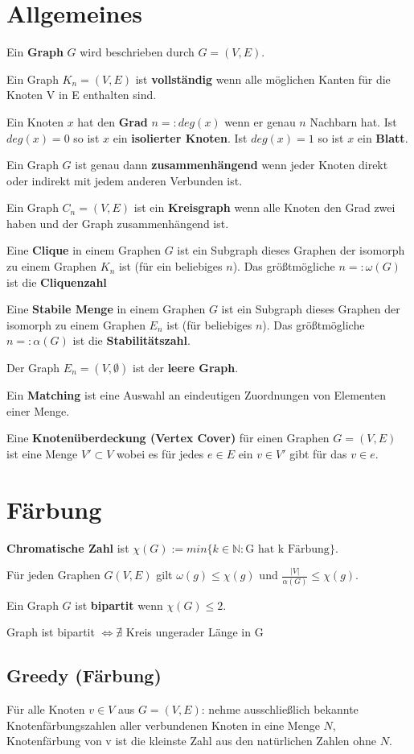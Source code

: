 \documentclass[10pt,a4paper]{article}
\begin{document}
\section{Allgemeines}
Ein \textbf{Graph} $G$ wird beschrieben durch $G = (V, E)$.

Ein Graph $K_n = (V, E)$ ist \textbf{vollständig} wenn alle möglichen Kanten für die Knoten V in E enthalten sind.

Ein Knoten $x$ hat den \textbf{Grad} $n =: deg(x)$ wenn er genau $n$ Nachbarn hat. Ist $deg(x) = 0$ so ist $x$ ein \textbf{isolierter Knoten}. Ist $deg(x) = 1$ so ist $x$ ein \textbf{Blatt}.

Ein Graph $G$ ist genau dann \textbf{zusammenhängend} wenn jeder Knoten direkt oder indirekt mit jedem anderen Verbunden ist.

Ein Graph $C_n = (V, E)$ ist ein \textbf{Kreisgraph} wenn alle Knoten den Grad zwei haben und der Graph zusammenhängend ist.

Eine \textbf{Clique} in einem Graphen $G$ ist ein Subgraph dieses Graphen der isomorph zu einem Graphen $K_n$ ist (für ein beliebiges $n$). Das größtmögliche $n =: \omega(G)$ ist die \textbf{Cliquenzahl}

Eine \textbf{Stabile Menge} in einem Graphen $G$ ist ein Subgraph dieses Graphen der isomorph zu einem Graphen $E_n$ ist (für beliebiges $n$).
Das größtmögliche $ n =: \alpha(G) $ ist die \textbf{Stabilitätszahl}.

Der Graph $E_n = (V, \emptyset)$ ist der \textbf{leere Graph}.

Ein \textbf{Matching} ist eine Auswahl an eindeutigen Zuordnungen von Elementen einer Menge.

Eine \textbf{Knotenüberdeckung (Vertex Cover)} für einen Graphen $G = (V, E)$ ist eine Menge $V' \subset V$ wobei es für jedes $e \in E$ ein $v \in V'$ gibt für das $v \in e$.
\section{Färbung}
\textbf{Chromatische Zahl} ist $\chi(G) := min\lbrace k \in \mathbb{N} : \mbox{G hat k Färbung} \rbrace$.

Für jeden Graphen $G(V,E)$ gilt $\omega(g) \leq \chi(g)$ und
$\frac{|V|}{\alpha(G)} \leq \chi(g)$.

Ein Graph $G$ ist \textbf{bipartit} wenn $\chi(G) \leq 2$.

Graph ist bipartit $\Leftrightarrow \nexists$ Kreis ungerader Länge in G
\subsection{Greedy (Färbung)}
Für alle Knoten $v \in V$ aus $G = (V, E)$: nehme ausschließlich bekannte Knotenfärbungszahlen aller verbundenen Knoten in eine Menge $N$, Knotenfärbung von v ist die kleinste Zahl aus den natürlichen Zahlen ohne $N$.
\end{document}
